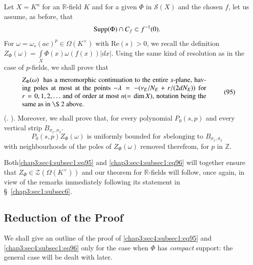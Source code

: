 Let $X=K^{n}$ for an $\mathbb{R}$-field $K$ and for a given $\Phi$ in
$\mathscr{S}(X)$ and the chosen $f$, let us assume, as before, that
$$
\operatorname{Supp}(\Phi)\cap C_{f}\subset f^{-1}(0).
$$
For $\omega=\omega_{s}(ac)^{p}\in\Omega(K^{\times})$ with $\text{Re
}(s)>0$, we recall the definition
$Z_{\Phi}(\omega)=\int\limits_{X}\Phi(x)\omega(f(x))|dx|$. Using the
same kind of resolution as in the case of $p$-fields, we shall prove
that
\begin{equation*}
\begin{tabular}{p{9.5cm}}
$Z_{\Phi}(\omega)$ { has a meromorphic continuation to the entire
    $s$-plane, having poles at most at the points
    $-\lambda=-(\nu_{E}/N_{E}+r/(2dN_{E}))$ for $r=0,1,2,\ldots$ and
    of order at most $n(=\dim X)$, notation being the same as in \S 2 above.}
\end{tabular}\tag{95}\label{chap3:sec4:subsec1:eq95}
\end{equation*}
(\cf \cite{Ati}. \cite{Ber-Gel}). Moreover, we shall prove that, for every
polynomial $P_{0}(s,p)$ and every vertical strip
$B_{\sigma_{1},\sigma_{2}}$.
\begin{equation*}
P_{0}(s,p)Z_{\Phi}(\omega)\text{ is uniformly bounded for $s$
  belonging to } B_{\sigma_{1},\sigma_{2}}\tag{96}\label{chap3:sec4:subsec1:eq96}
\end{equation*}
with neighbourhoods of the poles of $Z_{\Phi}(\omega)$ removed
therefrom, for $p$ in $\mathbb{Z}$. 

Both\pageoriginale \ref{chap3:sec4:subsec1:eq95} and \ref{chap3:sec4:subsec1:eq96} will together ensure that
$Z_{\Phi}\in \mathscr{Z}(\Omega(K^{\times}))$ and our theorem for
$\mathbb{R}$-fields will follow, once again, in view of the remarks
immediately following its statement in \S\ \ref{chap3:sec1:subsec6}.

\subsection{Reduction of the Proof}\label{chap3:sec4:subsec2} %

We shall give an outline of the proof of \ref{chap3:sec4:subsec1:eq95}
and \ref{chap3:sec4:subsec1:eq96}
only for the case when $\Phi$ has {\em compact} support: the general
case will be dealt with later.


